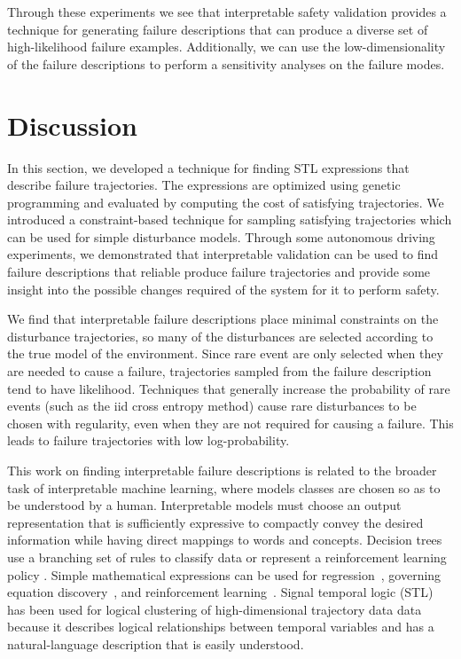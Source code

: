 Through these experiments we see that interpretable safety validation provides a technique for generating failure descriptions that can produce a diverse set of high-likelihood failure examples. Additionally, we can use the low-dimensionality of the failure descriptions to perform a sensitivity analyses on the failure modes. 



\section{Discussion}
In this section, we developed a technique for finding STL expressions that describe failure trajectories. The expressions are optimized using genetic programming and evaluated by computing the cost of satisfying trajectories. We introduced a constraint-based technique for sampling satisfying trajectories which can be used for simple disturbance models. Through some autonomous driving experiments, we demonstrated that interpretable validation can be used to find failure descriptions that reliable produce failure trajectories and provide some insight into the possible changes required of the system for it to perform safety.  

We find that interpretable failure descriptions place minimal constraints on the disturbance trajectories, so many of the disturbances are selected according to the true model of the environment. Since rare event are only selected when they are needed to cause a failure, trajectories sampled from the failure description tend to have likelihood. Techniques that generally increase the probability of rare events (such as the iid cross entropy method) cause rare disturbances to be chosen with regularity, even when they are not required for causing a failure. This leads to failure trajectories with low log-probability. 

This work on finding interpretable failure descriptions is related to the broader task of interpretable machine learning, where models classes are chosen so as to be understood by a human. Interpretable models must choose an output representation that is sufficiently expressive to compactly convey the desired information while having direct mappings to words and concepts. Decision trees use a branching set of rules to classify data \cite{breiman2017classification} or represent a reinforcement learning policy \cite{rodriguez2019interpretable}. Simple mathematical expressions can be used for regression~\cite{schielzeth2010simple}, governing equation discovery~\cite{brunton2016discovering}, and reinforcement learning~\cite{hein2017particle}. Signal temporal logic (STL) has been used for logical clustering of high-dimensional trajectory data data~\cite{lee2018interpretable,vazquez2017logical} because it describes logical relationships between temporal variables and has a natural-language description that is easily understood.

